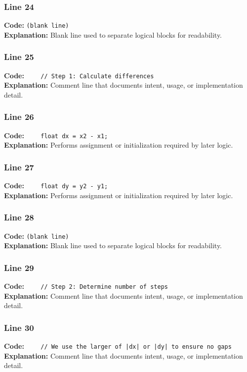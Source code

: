 \documentclass[11pt,a4paper]{article}
\begin{document}
\subsubsection*{Line 24}
\textbf{Code:} \texttt{(blank line)}\\
\textbf{Explanation:} Blank line used to separate logical blocks for readability.

\subsubsection*{Line 25}
\textbf{Code:} \verb|    // Step 1: Calculate differences|\\
\textbf{Explanation:} Comment line that documents intent, usage, or implementation detail.

\subsubsection*{Line 26}
\textbf{Code:} \verb|    float dx = x2 - x1;|\\
\textbf{Explanation:} Performs assignment or initialization required by later logic.

\subsubsection*{Line 27}
\textbf{Code:} \verb|    float dy = y2 - y1;|\\
\textbf{Explanation:} Performs assignment or initialization required by later logic.

\subsubsection*{Line 28}
\textbf{Code:} \texttt{(blank line)}\\
\textbf{Explanation:} Blank line used to separate logical blocks for readability.

\subsubsection*{Line 29}
\textbf{Code:} \verb|    // Step 2: Determine number of steps|\\
\textbf{Explanation:} Comment line that documents intent, usage, or implementation detail.

\subsubsection*{Line 30}
\textbf{Code:} \verb!    // We use the larger of |dx| or |dy| to ensure no gaps!\\
\textbf{Explanation:} Comment line that documents intent, usage, or implementation detail.
\end{document}
